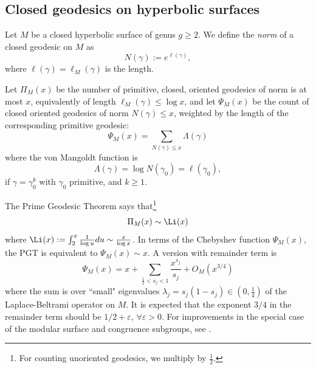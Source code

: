 \documentclass[12pt]{amsart}
\begin{document}
\subsection{Closed geodesics on hyperbolic surfaces}

Let $M$ be a closed hyperbolic surface of genus $g\geq 2$. 
We define the {\em norm} of a closed geodesic on $M$  as 
$$N(\gamma):=e^{\ell(\gamma)},$$ 
where $\ell(\gamma)=\ell_M(\gamma)$  is the length. 

Let $\Pi_M(x)$ be the number of   primitive,  closed,  oriented   geodesics of  norm is at most $x$, equivalently of length $\ell_M(\gamma)\leq \log x$, and let $\Psi_M(x)$ be the   count of closed  oriented  
 geodesics of norm $N(\gamma)\leq x$, weighted by the length  of the corresponding primitive geodesic:
\[
\Psi_M(x)=\sum_{N(\gamma)\leq x} \Lambda(\gamma)
\] 
where the von Mangoldt function is
$$
\Lambda(\gamma) =\log N(\gamma_0)= \ell(\gamma_0),
$$ 
if $\gamma=\gamma_0^k$ with  $\gamma_0$ primitive, and $k\geq 1$. 




The Prime Geodesic Theorem \cite{Selberg1954, Huber} says that\footnote{For counting unoriented geodesics, we multiply by $\tfrac 12$.} 
\[  
\Pi_M(x) \sim  \Li(x) %
\]
where $\Li(x):=\int_2^x\frac1{\log u} du\sim \frac{x}{\log x}$. 
In terms of the Chebyshev function $\Psi_M(x)$, the PGT is equivalent to  $\Psi_M(x)\sim x$. A version with remainder term is 
\[
\Psi_M(x) = x+\sum_{\frac 12 <s_j<1} \frac{x^{s_j}}{s_j} +  O_M(x^{3/4})  
\] 
where the sum is over ``small" eigenvalues $\lambda_j=s_j(1-s_j)\in (0,\frac 14)$ of the Laplace-Beltrami operator on $M$. 
It is expected that the exponent $3/4$ in the remainder term should be  $1/2+\varepsilon$, $\forall \varepsilon>0$.  For improvements in the special case of the modular surface and congruence subgroups, see \cite{Iwaniec, LuoSarnakPIHES, Cai, SoundYoung, AcostaReche}.







\end{document}

